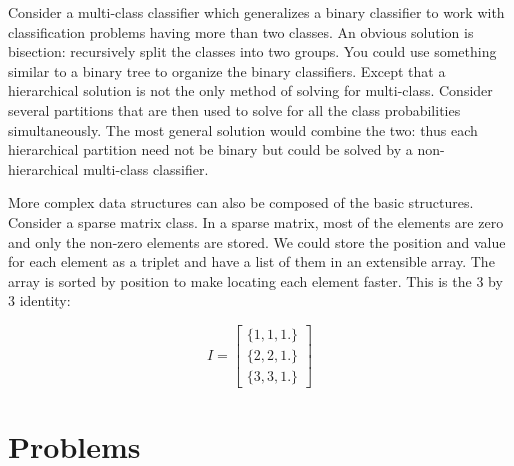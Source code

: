 \documentclass{article}
\begin{document}
Consider a multi-class classifier which generalizes a binary classifier to
work with classification problems having more than two classes.
An obvious solution is bisection: recursively split the classes into
two groups.
You could use something similar to a binary tree to organize the binary
classifiers.
Except that a hierarchical solution is not the only method of solving for
multi-class.
Consider several partitions that are then used to solve for all the 
class probabilities simultaneously.
The most general solution would combine the two: thus each hierarchical
partition need not be binary but could be solved by a non-hierarchical 
multi-class classifier.

More complex data structures can also be composed of the basic structures.
Consider a sparse matrix class. In a sparse matrix, most of the elements
are zero and only the non-zero elements are stored.
We could store the position and value for each element as a triplet and
have a list of them in an extensible array.
The array is sorted by position to make locating each element faster.
This is the 3 by 3 identity:

\begin{equation}
I = \left [ \begin{array}{l}
	\lbrace 1, 1, 1. \rbrace\\
	\lbrace 2, 2, 1. \rbrace\\
	\lbrace 3, 3, 1. \rbrace
\end{array}
\right ]
\end{equation}

\section{Problems}
\end{document}

